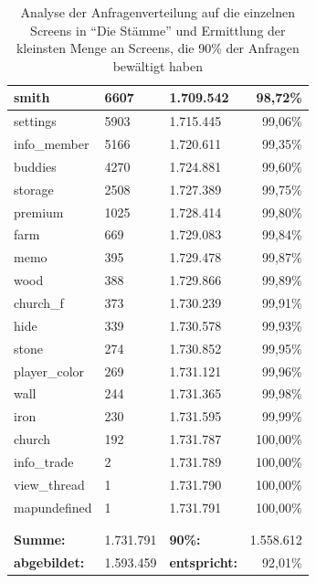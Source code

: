 \documentclass[10pt]{scrartcl}
\begin{document}
\begin{table}
\begin{tabular}{|l|l|l|r|}
   smith              & 6607 & 1.709.542 & 98,72\% \\ \hline
   settings           & 5903 & 1.715.445 & 99,06\% \\ \hline
   info\_member        & 5166 & 1.720.611 & 99,35\% \\ \hline
   buddies            & 4270 & 1.724.881 & 99,60\% \\ \hline
   storage            & 2508 & 1.727.389 & 99,75\% \\ \hline
   premium            & 1025 & 1.728.414 & 99,80\% \\ \hline
   farm               & 669 & 1.729.083 & 99,84\% \\ \hline
   memo               & 395 & 1.729.478 & 99,87\% \\ \hline
   wood               & 388 & 1.729.866 & 99,89\% \\ \hline
   church\_f           & 373 & 1.730.239 & 99,91\% \\ \hline
   hide               & 339 & 1.730.578 & 99,93\% \\ \hline
   stone              & 274 & 1.730.852 & 99,95\% \\ \hline
   player\_color       & 269 & 1.731.121 & 99,96\% \\ \hline
   wall               & 244 & 1.731.365 & 99,98\% \\ \hline
   iron               & 230 & 1.731.595 & 99,99\% \\ \hline
   church             & 192 & 1.731.787 & 100,00\% \\ \hline
   info\_trade         & 2 & 1.731.789 & 100,00\% \\ \hline
   view\_thread        & 1 & 1.731.790 & 100,00\% \\ \hline
   mapundefined       & 1 & 1.731.791 & 100,00\% \\ \hline
   & \multicolumn{1}{l|}{} & \multicolumn{1}{l|}{} & \multicolumn{1}{l|}{} \\ \hline
   & \multicolumn{1}{l|}{} & \multicolumn{1}{l|}{} & \multicolumn{1}{l|}{} \\ \hline
  \textbf{Summe:} & 1.731.791 & \textbf{90\%:} & 1.558.612 \\ \hline
  \textbf{abgebildet:} & 1.593.459 & \textbf{entspricht:} & 92,01\% \\ \hline
  
\end{tabular}
\caption{Analyse der Anfragenverteilung auf die einzelnen Screens in ``Die Stämme'' und Ermittlung der kleinsten Menge an Screens, die 90\% der Anfragen bewältigt haben}
\label{table:game_analysis_screens}
\end{table}
\end{document}
